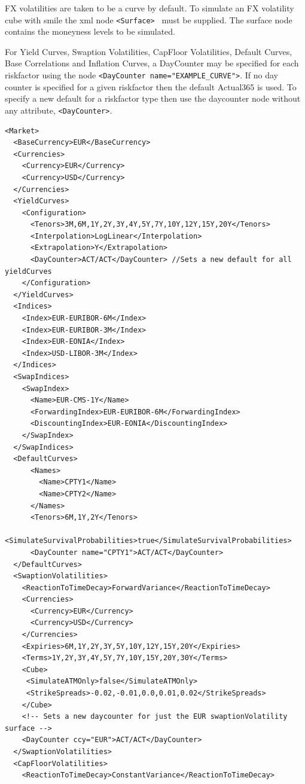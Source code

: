 \documentclass[12pt, a4paper]{article}
\newenvironment{longlisting}{\captionsetup{type=listing}}{}
\begin{document}
FX volatilities are taken to be a curve by default. To simulate an FX volatility cube with smile the xml node {\tt <Surface> } must be supplied. The surface node contains the moneyness levels to be simulated.

For Yield Curves, Swaption Volatilities, CapFloor Volatilities, Default Curves, Base Correlations and Inflation Curves, a DayCounter may be specified for each riskfactor using the node {\tt <DayCounter name="EXAMPLE\_CURVE">}.  
If no day counter is specified for a given riskfactor then the default Actual365 is used. To specify a new default for a riskfactor type then use the daycounter node without any attribute,  {\tt <DayCounter>}. 

\begin{longlisting}
\begin{verbatim}
<Market>
  <BaseCurrency>EUR</BaseCurrency>
  <Currencies>
    <Currency>EUR</Currency>
    <Currency>USD</Currency>
  </Currencies>
  <YieldCurves>
    <Configuration>
      <Tenors>3M,6M,1Y,2Y,3Y,4Y,5Y,7Y,10Y,12Y,15Y,20Y</Tenors>
      <Interpolation>LogLinear</Interpolation>
      <Extrapolation>Y</Extrapolation>
      <DayCounter>ACT/ACT</DayCounter> //Sets a new default for all yieldCurves 
    </Configuration>
  </YieldCurves>
  <Indices>
    <Index>EUR-EURIBOR-6M</Index>
    <Index>EUR-EURIBOR-3M</Index>
    <Index>EUR-EONIA</Index>
    <Index>USD-LIBOR-3M</Index>
  </Indices>
  <SwapIndices>
    <SwapIndex>
      <Name>EUR-CMS-1Y</Name>
      <ForwardingIndex>EUR-EURIBOR-6M</ForwardingIndex>
      <DiscountingIndex>EUR-EONIA</DiscountingIndex>
    </SwapIndex>
  </SwapIndices>
  <DefaultCurves> 
      <Names> 
        <Name>CPTY1</Name> 
        <Name>CPTY2</Name> 
      </Names> 
      <Tenors>6M,1Y,2Y</Tenors> 
      <SimulateSurvivalProbabilities>true</SimulateSurvivalProbabilities> 
      <DayCounter name="CPTY1">ACT/ACT</DayCounter> 
  </DefaultCurves> 
  <SwaptionVolatilities>
    <ReactionToTimeDecay>ForwardVariance</ReactionToTimeDecay>
    <Currencies>
      <Currency>EUR</Currency>
      <Currency>USD</Currency>
    </Currencies>
    <Expiries>6M,1Y,2Y,3Y,5Y,10Y,12Y,15Y,20Y</Expiries>
    <Terms>1Y,2Y,3Y,4Y,5Y,7Y,10Y,15Y,20Y,30Y</Terms>
    <Cube>
     <SimulateATMOnly>false</SimulateATMOnly>
     <StrikeSpreads>-0.02,-0.01,0.0,0.01,0.02</StrikeSpreads>
    </Cube>
    <!-- Sets a new daycounter for just the EUR swaptionVolatility surface -->
    <DayCounter ccy="EUR">ACT/ACT</DayCounter> 
  </SwaptionVolatilities> 
  <CapFloorVolatilities>
    <ReactionToTimeDecay>ConstantVariance</ReactionToTimeDecay>

\end{verbatim}
\end{longlisting}
\end{document}
